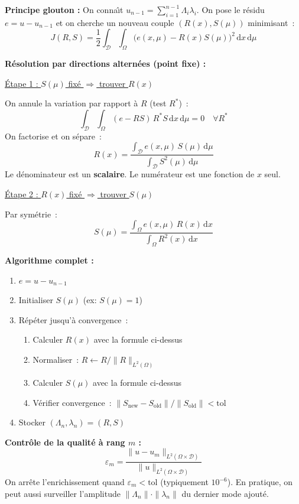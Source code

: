 \documentclass[11pt,a4paper]{article}
\begin{document}
\begin{formulabox}
\textbf{Principe glouton :} On conna\^{\i}t $u_{n-1} = \sum_{i=1}^{n-1}\Lambda_i\lambda_i$. On pose le r\'esidu $e = u - u_{n-1}$ et on cherche un nouveau couple $(R(x), S(\mu))$ minimisant~:
\[
J(R,S) = \frac{1}{2}\int_\mathcal{D}\int_\Omega \big(e(x,\mu) - R(x)S(\mu)\big)^2\,\mathrm{d}x\,\mathrm{d}\mu
\]

\textbf{R\'esolution par directions altern\'ees (point fixe) :}

\medskip
\underline{\'Etape 1 : $S(\mu)$ fix\'e $\Rightarrow$ trouver $R(x)$}

On annule la variation par rapport \`a $R$ (test $R^*$)~:
\[
\int_\mathcal{D}\int_\Omega (e - RS)\,R^*S\,\mathrm{d}x\,\mathrm{d}\mu = 0 \quad\forall R^*
\]
On factorise et on s\'epare~:
\[
\boxed{R(x) = \frac{\displaystyle\int_\mathcal{D} e(x,\mu)\,S(\mu)\,\mathrm{d}\mu}{\displaystyle\int_\mathcal{D} S^2(\mu)\,\mathrm{d}\mu}}
\]
Le d\'enominateur est un \textbf{scalaire}. Le num\'erateur est une fonction de $x$ seul.

\medskip
\underline{\'Etape 2 : $R(x)$ fix\'e $\Rightarrow$ trouver $S(\mu)$}

Par sym\'etrie~:
\[
\boxed{S(\mu) = \frac{\displaystyle\int_\Omega e(x,\mu)\,R(x)\,\mathrm{d}x}{\displaystyle\int_\Omega R^2(x)\,\mathrm{d}x}}
\]

\textbf{Algorithme complet :}
\begin{enumerate}[nosep]
\item $e = u - u_{n-1}$
\item Initialiser $S(\mu)$ (ex: $S(\mu) = 1$)
\item R\'ep\'eter jusqu'\`a convergence~:
\begin{enumerate}[nosep,label=(\alph*)]
\item Calculer $R(x)$ avec la formule ci-dessus
\item Normaliser~: $R \leftarrow R/\|R\|_{L^2(\Omega)}$
\item Calculer $S(\mu)$ avec la formule ci-dessus
\item V\'erifier convergence~: $\|S_{\text{new}} - S_{\text{old}}\|/\|S_{\text{old}}\| < \text{tol}$
\end{enumerate}
\item Stocker $(\Lambda_n, \lambda_n) = (R, S)$
\end{enumerate}

\textbf{Contr\^ole de la qualit\'e \`a rang $m$ :}
\[
\boxed{\varepsilon_m = \frac{\|u - u_m\|_{L^2(\Omega\times\mathcal{D})}}{\|u\|_{L^2(\Omega\times\mathcal{D})}}}
\]
On arr\^ete l'enrichissement quand $\varepsilon_m < \text{tol}$ (typiquement $10^{-6}$). En pratique, on peut aussi surveiller l'amplitude $\|\Lambda_n\|\cdot\|\lambda_n\|$ du dernier mode ajout\'e.
\end{formulabox}
\end{document}
